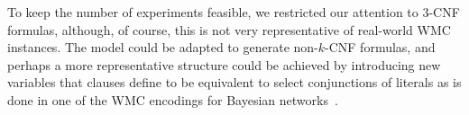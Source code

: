 \documentclass[letterpaper]{article} %
\theoremstyle{definition}
\theoremstyle{remark}
\begin{document}
To keep the number of experiments feasible, we restricted our attention to 3-CNF
formulas, although, of course, this is not very representative of real-world
\textsf{WMC} instances. The model could be adapted to generate non-$k$-CNF
formulas, and perhaps a more representative structure could be achieved by
introducing new variables that clauses define to be equivalent to select
conjunctions of literals as is done in one of the \textsf{WMC} encodings for
Bayesian networks~\cite{DBLP:conf/kr/Darwiche02}.


\end{document}
